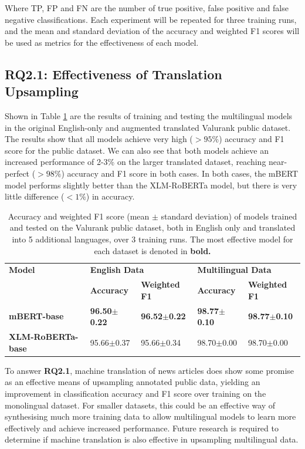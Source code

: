\documentclass{l4proj}
\begin{document}
Where TP, FP and FN are the number of true positive, false positive and false negative classifications. Each experiment will be repeated for three training runs, and the mean and standard deviation of the accuracy and weighted F1 scores will be used as metrics for the effectiveness of each model.

\subsection{RQ2.1: Effectiveness of Translation Upsampling}
Shown in Table \ref{table:backtranslation-effectiveness} are the results of training and testing the multilingual models in the original English-only and augmented translated Valurank public dataset. The results show that all models achieve very high ($>95\%$) accuracy and F1 score for the public dataset. We can also see that both models achieve an increased performance of 2-3\% on the larger translated dataset, reaching near-perfect ($>98\%$) accuracy and F1 score in both cases. In both cases, the mBERT model performs slightly better than the XLM-RoBERTa model, but there is very little difference ($<1\%$) in accuracy.

\begin{table}[h]
\begin{tabular}{lllll}
\hline
\textbf{Model}   & \multicolumn{2}{l}{\textbf{English Data}} & \multicolumn{2}{l}{\textbf{Multilingual Data}} \\ \cline{2-5} 
                 & \textbf{Accuracy}    & \textbf{Weighted F1}   & \textbf{Accuracy}   & \textbf{Weighted F1}   \\ \hline 
\textbf{mBERT-base}       & \textbf{96.50$\pm$0.22}    & \textbf{96.52$\pm$0.22}          & \textbf{98.77$\pm$0.10}       & \textbf{98.77$\pm$0.10}          \\
\textbf{XLM-RoBERTa-base} & 95.66$\pm$0.37    & 95.66$\pm$0.34          & 98.70$\pm$0.00       & 98.70$\pm$0.00   
     \\ \hline
\end{tabular}
\caption{Accuracy and weighted F1 score (mean $\pm$ standard deviation) of models trained and tested on the Valurank public dataset, both in English only and translated into 5 additional languages, over 3 training runs. The most effective model for each dataset is denoted in \textbf{bold.}}
\label{table:backtranslation-effectiveness}
\end{table}

To answer \textbf{RQ2.1}, machine translation of news articles does show some promise as an effective means of upsampling annotated public data, yielding an improvement in classification accuracy and F1 score over training on the monolingual dataset. For smaller datasets, this could be an effective way of synthesising much more training data to allow multilingual models to learn more effectively and achieve increased performance. Future research is required to determine if machine translation is also effective in upsampling multilingual data.
\end{document}
